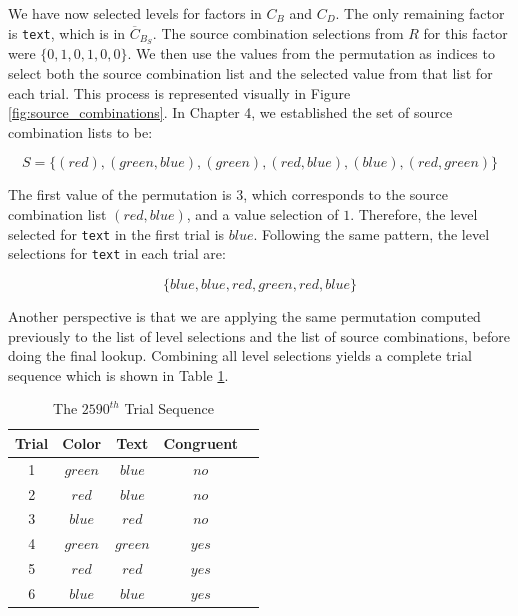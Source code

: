 We have now selected levels for factors in $C_B$ and $C_D$. The only remaining factor is \texttt{text}, which is in $\overline{C}_{B_S}$. The source combination selections from $R$ for this factor were $\{0, 1, 0, 1, 0, 0\}$. We then use the values from the permutation as indices to select both the source combination list and the selected value from that list for each trial. This process is represented visually in Figure \ref{fig:source_combinations}. In Chapter 4, we established the set of source combination lists to be:

\[
S = \{(red), (green, blue), (green), (red, blue), (blue), (red, green)\}
\]

The first value of the permutation is $3$, which corresponds to the source combination list $(red, blue)$, and a value selection of $1$. Therefore, the level selected for \texttt{text} in the first trial is $blue$. Following the same pattern, the level selections for \texttt{text} in each trial are:

\[
  \{blue, blue, red, green, red, blue\}
\]

Another perspective is that we are applying the same permutation computed previously to the list of level selections and the list of source combinations, before doing the final lookup. Combining all level selections yields a complete trial sequence which is shown in Table \ref{tab:example_trial_sequence}.

\begin{table}[b]
  \centering
  \caption{The $2590^{th}$ Trial Sequence}
\begin{tabular}{|c|c|c|c|c|}
\hline
\multicolumn{1}{|l|}{Trial} & Color   & Text    & Congruent \\ \hline
1                           & $green$ & $blue$  & $no$      \\ \hline
2                           & $red$   & $blue$  & $no$      \\ \hline
3                           & $blue$  & $red$   & $no$      \\ \hline
4                           & $green$ & $green$ & $yes$     \\ \hline
5                           & $red$   & $red$   & $yes$     \\ \hline
6                           & $blue$  & $blue$  & $yes$     \\ \hline
\end{tabular}
\label{tab:example_trial_sequence}
\end{table}


